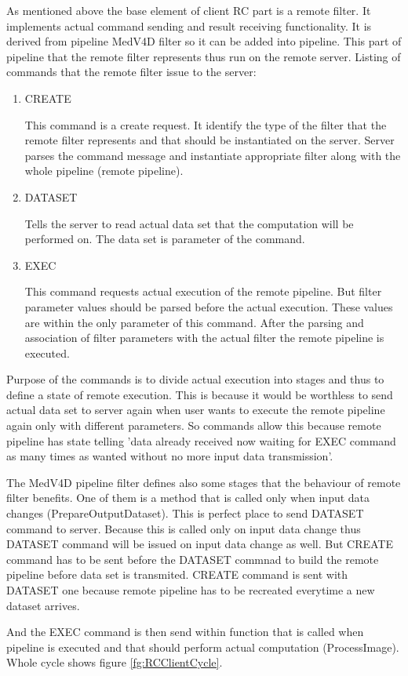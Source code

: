 As mentioned above the base element of client RC part is a remote filter.
It implements actual command sending and result receiving functionality.
It is derived from pipeline MedV4D filter so it can be added into pipeline.
This part of pipeline that the remote filter represents thus run on the remote server.
Listing of commands that the remote filter issue to the server:
\begin{enumerate}
  \item{CREATE}
  \par
  This command is a create request.
It identify the type of the filter that the remote filter represents and that should be instantiated on the server.
Server parses the command message and instantiate appropriate filter along with the whole pipeline (remote pipeline).

  \item{DATASET}
  \par
  Tells the server to read actual data set that the computation will be performed on.
The data set is parameter of the command.

  \item{EXEC}
\par
  This command requests actual execution of the remote pipeline.
But filter parameter values should be parsed before the actual execution.
These values are within the only parameter of this command.
After the parsing and association of filter parameters with the actual filter the remote pipeline is executed.
\end{enumerate}

\par
Purpose of the commands is to divide actual execution into stages and thus to define a state of remote execution.
This is because it would be worthless to send actual data set to server again when user wants to execute the remote pipeline again only with different parameters.
So commands allow this because remote pipeline has state telling 'data already received now waiting for EXEC command as many times as wanted without no more input data transmission'.
\par
The MedV4D pipeline filter defines also some stages that the behaviour of remote filter benefits.
One of them is a method that is called only when input data changes (PrepareOutputDataset).
This is perfect place to send DATASET command to server.
Because this is called only on input data change thus DATASET command will be issued on input data change as well.
But CREATE command has to be sent before the DATASET commnad to build the remote pipeline before data set is transmited.
CREATE command is sent with DATASET one because remote pipeline has to be recreated everytime a new dataset arrives.
\par
And the EXEC command is then send within function that is called when pipeline is executed and that should perform actual computation (ProcessImage).
Whole cycle shows figure \ref{fg:RCClientCycle}.

